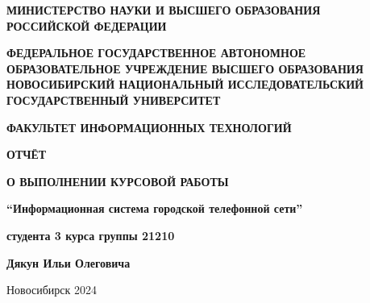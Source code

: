 \documentclass{article}
\begin{document}
\begin{titlepage}

\newcommand{\headerHead}[1]{ {\fontsize{14pt}{0}\bfseries\centering
\MakeUppercase{#1} } }


\headerHead{Министерство науки и высшего образования \\
	Российской Федерации \\} \leavevmode

\headerHead{Федеральное Государственное Автономное \\
    образовательное учреждение высшего образования \\
    новосибирский национальный исследовательский
    государственный университет \\} \leavevmode

\headerHead{Факультет информационных технологий \\} \leavevmode

\begin{center}

\textbf{ОТЧЁТ}

\textbf{О ВЫПОЛНЕНИИ КУРСОВОЙ РАБОТЫ}

\textbf{“Информационная система городской телефонной сети”}
   
\hfill \break
\textbf{студента 3 курса группы 21210}
   
\textbf{Дякун Ильи Олеговича}

\vfill
Новосибирск 2024
\end{center}

\end{titlepage}
\end{document}
